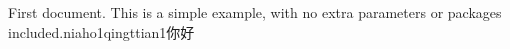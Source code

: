 \documentclass{article}
\begin{document}
First document. This is a simple example, with no 
extra parameters or packages included.niaho1qingttian1你好
\end{document}
